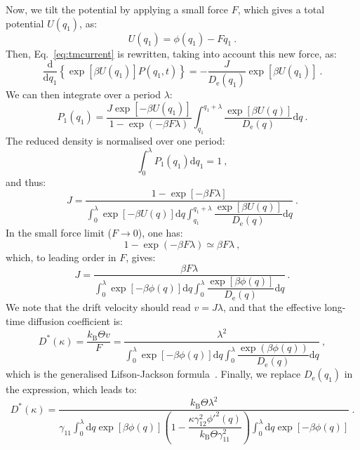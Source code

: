 Now, we tilt the potential by applying a small force $F$, which gives a total potential $U(q_1)$, as:
\begin{equation}
    U(q_1) = \phi(q_1) - Fq_1~.
\end{equation}
Then, Eq.~\ref{eq:tmcurrent} is rewritten, taking into account this new force, as:
\begin{equation}
    \dfrac{\mathrm{d}}{\mathrm{d}q_1} \left\{ \exp[\beta U(q_1)] P(q_1, t)\right\} = - \dfrac{J}{D_\mathrm{e}(q_1)} \exp[\beta U(q_1)]~.
\end{equation}
We can then integrate over a period $\lambda$:
\begin{equation}
    P_1(q_1) = \dfrac{J \exp[-\beta U(q_1)]}{1 - \exp(-\beta F \lambda)} \int_{q_1}^{q_1 + \lambda} \dfrac{\exp[\beta U(q)]}{D_\mathrm{e}(q)}\mathrm{d}q~.
\end{equation}
The reduced density is normalised over one period:
\begin{equation}
    \int_{0}^{\lambda}P_1(q_1)\mathrm{d}q_1 = 1~,
\end{equation}
and thus:
\begin{equation}
    J = \dfrac{1 - \exp[-\beta F \lambda]}{\int_{0}^{\lambda} \exp[-\beta U(q)]\mathrm{d}q \int_{q_1}^{q_1+\lambda} \dfrac{\exp[\beta U(q)]}{D_\mathrm{e}(q)}\mathrm{d}q}~.
\end{equation}
In the small force limit ($F \to 0$), one has:
\begin{equation}
    1 - \exp(-\beta F \lambda)  \simeq \beta F \lambda~,
\end{equation}
which, to leading order in $F$, gives:
\begin{equation}
    J = \dfrac{\beta F \lambda}{\int_{0}^{\lambda} \exp[-\beta \phi(q)] \mathrm{d}q \int_{0}^{\lambda} \dfrac{\exp[\beta \phi(q)]}{D_\mathrm{e}(q)}\mathrm{d}q}~.
\end{equation}
We note that the drift velocity should read $v = J \lambda$, and that the effective long-time diffusion coefficient is:
\begin{equation}
    D^*(\kappa) = \dfrac{k_\mathrm{B}\Theta v}{F} = \dfrac{\lambda^2}{\int_{0}^{\lambda} \exp[-\beta \phi(q)]\mathrm{d}q \int_{0}^{\lambda} \dfrac{\exp(\beta \phi(q))}{D_\mathrm{e}(q)}\mathrm{d}q}~,
\end{equation}
which is the generalised Lifson-Jackson formula~\cite{LifsonJackson}. Finally, we replace $D_\mathrm{e}(q_1)$ in the expression, which leads to:
\begin{equation}
    D^*(\kappa) = \dfrac{k_\mathrm{B}\Theta\lambda^2}{\gamma_{11}\int_{0}^{\lambda} \mathrm{d}q \exp[\beta \phi(q)] \left(1 - \dfrac{\kappa \gamma_{12}^2 \phi'^2(q)}{k_\mathrm{B}\Theta \gamma_{11}^2}\right) \int_{0}^{\lambda} \mathrm{d}q \exp[-\beta \phi(q)]}~.
\end{equation}
